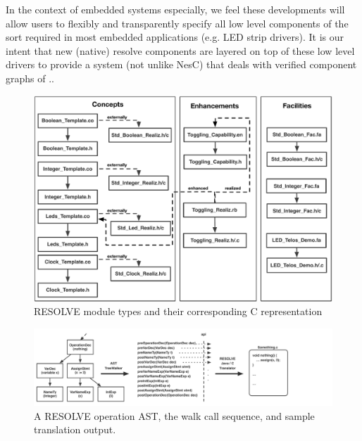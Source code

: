 \documentclass{sig-alternate}
\begin{document}
In the context of embedded systems especially, we feel these developments will allow users to flexibly and transparently specify all low level components of the sort required in most embedded applications (e.g. LED strip drivers). It is our intent that new (native) resolve components are layered on top of these low level drivers to provide a system (not unlike NesC) that deals with verified component graphs of ..






\begin{figure}[!htb]
\centering
\includegraphics[scale=.45]{figs/implementation.pdf}
\caption{RESOLVE module types and their corresponding C representation}
\end{figure}
\label{fig:imp}

\begin{figure}
\centering
\includegraphics[scale=.55]{figs/ast_traversal.pdf}
\caption{A RESOLVE operation AST, the walk call sequence, and sample translation output.}
\end{figure}
\label{fig:ast}
\end{document}

